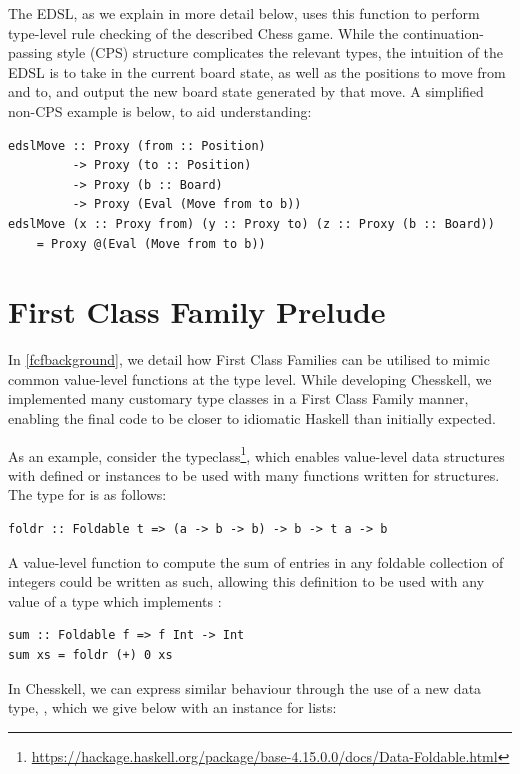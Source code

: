 The EDSL, as we explain in more detail below, uses this  function to perform type-level rule checking of the described Chess game. While the continuation-passing style (CPS) structure complicates the relevant types, the intuition of the EDSL is to take in the current board state, as well as the positions to move from and to, and output the new board state generated by that move. A simplified non-CPS example is below, to aid understanding:

\begin{lstlisting}
edslMove :: Proxy (from :: Position)
         -> Proxy (to :: Position)
         -> Proxy (b :: Board)
         -> Proxy (Eval (Move from to b))
edslMove (x :: Proxy from) (y :: Proxy to) (z :: Proxy (b :: Board))
    = Proxy @(Eval (Move from to b))
\end{lstlisting}

\section{First Class Family Prelude}

In \cref{fcfbackground}, we detail how First Class Families can be utilised to mimic common value-level functions at the type level. While developing Chesskell, we implemented many customary type classes in a First Class Family manner, enabling the final code to be closer to idiomatic Haskell than initially expected.

As an example, consider the  typeclass\footnote{\url{https://hackage.haskell.org/package/base-4.15.0.0/docs/Data-Foldable.html}}, which enables value-level data structures with defined  or  instances to be used with many functions written for  structures. The type for  is as follows:

\begin{lstlisting}
foldr :: Foldable t => (a -> b -> b) -> b -> t a -> b
\end{lstlisting}

A value-level function to compute the sum of entries in any foldable collection of integers could be written as such, allowing this definition to be used with any value of a type which implements :

\begin{lstlisting}
sum :: Foldable f => f Int -> Int
sum xs = foldr (+) 0 xs
\end{lstlisting}

In Chesskell, we can express similar behaviour through the use of a new data type, , which we give below with an  instance for lists:

